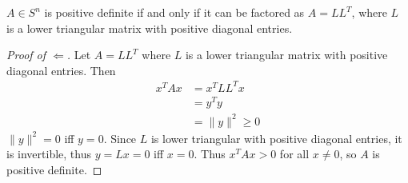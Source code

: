 \begin{theorem}[]
  $A \in S^n$ is positive definite if and only if it can be factored as $A = LL^T$, where $L$ is a lower triangular matrix with positive diagonal entries.
\end{theorem}
\begin{proof}[Proof of $\Leftarrow$]
  Let $A = LL^T$ where $L$ is a lower triangular matrix with positive diagonal entries. Then
  \begin{align*}
    x^T Ax &= x^T LL^T x \\
    &= y^T y \tag*{where $y = L^Tx$}\\
    &= \|y\|^2 \geq 0
  \end{align*}
  $\|y\|^2 = 0$ iff $y = 0$. Since $L$ is lower triangular with positive diagonal entries, it is invertible, thus $y = Lx = 0$ iff $x = 0$. Thus $x^T Ax > 0$ for all $x \neq 0$, so $A$ is positive definite.
\end{proof}

